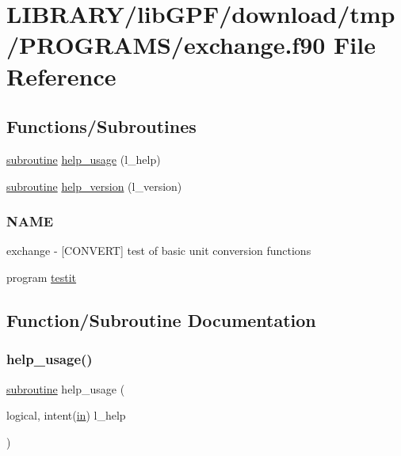 \hypertarget{exchange_8f90}{}\section{L\+I\+B\+R\+A\+R\+Y/lib\+G\+P\+F/download/tmp/\+P\+R\+O\+G\+R\+A\+M\+S/exchange.f90 File Reference}
\label{exchange_8f90}
\subsection*{Functions/\+Subroutines}
\begin{DoxyCompactItemize}
\item 
\hyperlink{M__stopwatch_83_8txt_acfbcff50169d691ff02d4a123ed70482}{subroutine} \hyperlink{exchange_8f90_a3e09a3b52ee8fb04eeb93fe5761626a8}{help\+\_\+usage} (l\+\_\+help)
\item 
\hyperlink{M__stopwatch_83_8txt_acfbcff50169d691ff02d4a123ed70482}{subroutine} \hyperlink{exchange_8f90_a39c21619b08a3c22f19e2306efd7f766}{help\+\_\+version} (l\+\_\+version)
\begin{DoxyCompactList}\small\item\em \subsubsection*{N\+A\+ME}

exchange -\/ \mbox{[}C\+O\+N\+V\+E\+RT\mbox{]} test of basic unit conversion functions \end{DoxyCompactList}\item 
program \hyperlink{exchange_8f90_a483d2219923eccf493a883fceee5a424}{testit}
\end{DoxyCompactItemize}


\subsection{Function/\+Subroutine Documentation}
\mbox{\label{exchange_8f90_a3e09a3b52ee8fb04eeb93fe5761626a8}} 
\subsubsection{\texorpdfstring{help\+\_\+usage()}{help\_usage()}}
{\footnotesize\ttfamily \hyperlink{M__stopwatch_83_8txt_acfbcff50169d691ff02d4a123ed70482}{subroutine} help\+\_\+usage (\begin{DoxyParamCaption}\item[{logical, intent(\hyperlink{M__journal_83_8txt_afce72651d1eed785a2132bee863b2f38}{in})}]{l\+\_\+help }\end{DoxyParamCaption})}



